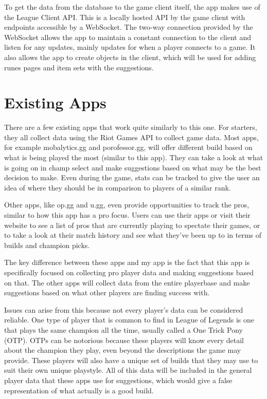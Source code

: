 \documentclass[10pt,twocolumn]{article}
\begin{document}
To get the data from the database to the game client itself, the app makes use of the League Client API.
This is a locally hosted API by the game client with endpoints accessible by a WebSocket.
The two-way connection provided by the WebSocket allows the app to maintain a constant connection to the client and listen for any updates, mainly updates for when a player connects to a game.
It also allows the app to create objects in the client, which will be used for adding runes pages and item sets with the suggestions.

\section{Existing Apps}
There are a few existing apps that work quite similarly to this one.
For starters, they all collect data using the Riot Games API to collect game data.
Most apps, for example mobalytics.gg and porofessor.gg, will offer different build based on what is being played the most (similar to this app).
They can take a look at what is going on in champ select and make suggestions based on what may be the best decision to make.
Even during the game, stats can be tracked to give the user an idea of where they should be in comparison to players of a similar rank.

Other apps, like op.gg and u.gg, even provide opportunities to track the pros, similar to how this app has a pro focus.
Users can use their apps or visit their website to see a list of pros that are currently playing to spectate their games, or to take a look at their match history and see what they've been up to in terms of builds and champion picks.

The key difference between these apps and my app is the fact that this app is specifically focused on collecting pro player data and making suggestions based on that.
The other apps will collect data from the entire playerbase and make suggestions based on what other players are finding success with.

Issues can arise from this because not every player's data can be considered reliable.
One type of player that is common to find in League of Legends is one that plays the same champion all the time, usually called a One Trick Pony (OTP).
OTPs can be notorious because these players will know every detail about the champion they play, even beyond the descriptions the game may provide.
These players will also have a unique set of builds that they may use to suit their own unique playstyle.
All of this data will be included in the general player data that these apps use for suggestions, which would give a false representation of what actually is a good build.
\end{document}
